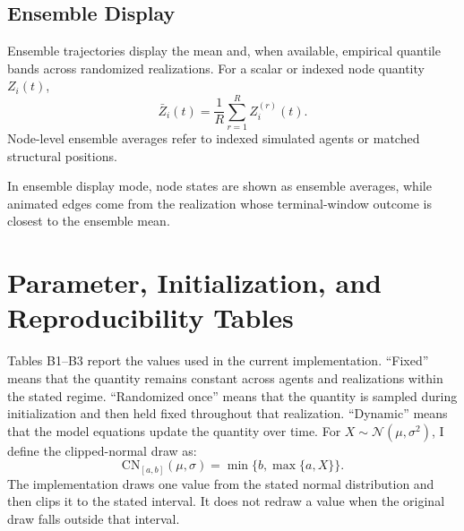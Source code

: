 \documentclass[11pt]{article}
\begin{document}
\subsection{Ensemble Display}
Ensemble trajectories display the mean and, when available, empirical quantile bands across randomized realizations. For a scalar or indexed node quantity $Z_i(t)$,
\[
\bar{Z}_i(t)=\frac{1}{R}\sum_{r=1}^RZ_i^{(r)}(t).
\]
Node-level ensemble averages refer to indexed simulated agents or matched structural positions. 

In ensemble display mode, node states are shown as ensemble averages, while animated edges come from the realization whose terminal-window outcome is closest to the ensemble mean.

\section{Parameter, Initialization, and Reproducibility Tables}
Tables B1–B3 report the values used in the current implementation. “Fixed” means that the quantity remains constant across agents and realizations within the stated regime. “Randomized once” means that the quantity is sampled during initialization and then held fixed throughout that realization. “Dynamic” means that the model equations update the quantity over time.
For $X \sim \mathcal{N}(\mu, \sigma^2)$, I define the clipped-normal draw as:
\[
\text{CN}_{[a,b]}(\mu,\sigma)=\min\{b,\max\{a,X\}\}.
\]
The implementation draws one value from the stated normal distribution and then clips it to the stated interval. It does not redraw a value when the original draw falls outside that interval.
\end{document}
